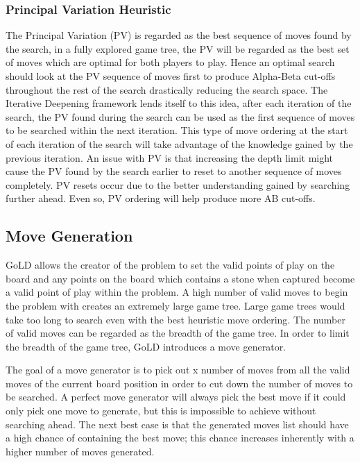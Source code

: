 \documentclass{l4proj}
\begin{document}
\subsubsection{Principal Variation Heuristic}
The Principal Variation (PV) is regarded as the best sequence of moves found by the search, in a fully explored game tree, the PV will be regarded as the best set of moves which are optimal for both players to play. Hence an optimal search should look at the PV sequence of moves first to produce Alpha-Beta cut-offs throughout the rest of the search drastically reducing the search space. The Iterative Deepening framework lends itself to this idea, after each iteration of the search, the PV found during the search can be used as the first sequence of moves to be searched within the next iteration. This type of move ordering at the start of each iteration of the search will take advantage of the knowledge gained by the previous iteration. An issue with PV is that increasing the depth limit might cause the PV found by the search earlier to reset to another sequence of moves completely. PV resets occur due to the better understanding gained by searching further ahead. Even so, PV ordering will help produce more AB cut-offs.

\subsection{Move Generation}
GoLD allows the creator of the problem to set the valid points of play on the board and any points on the board which contains a stone when captured become a valid point of play within the problem. A high number of valid moves to begin the problem with creates an extremely large game tree. Large game trees would take too long to search even with the best heuristic move ordering. The number of valid moves can be regarded as the breadth of the game tree. In order to limit the breadth of the game tree, GoLD introduces a move generator.

The goal of a move generator is to pick out x number of moves from all the valid moves of the current board position in order to cut down the number of moves to be searched. A perfect move generator will always pick the best move if it could only pick one move to generate, but this is impossible to achieve without searching ahead.  The next best case is that the generated moves list should have a high chance of containing the best move; this chance increases inherently with a higher number of moves generated.
\end{document}
